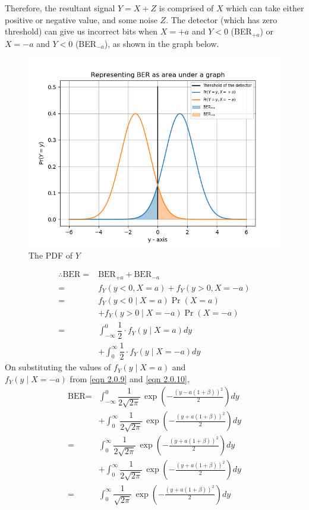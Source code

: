 \documentclass[journal,10pt,twocolumn]{IEEEtran}
\begin{document}
Therefore, the resultant signal $Y = X+Z$ is comprised of $X$ which can take either positive or negative value, and some noise $Z$. The detector (which has zero threshold) can give us incorrect bits when $X = +a$ and $Y<0$ (BER$_{+a}$) or $X=-a$ and $Y<0$ (BER$_{-a}$), as shown in the graph below.
~\\[-2em]
\begin{figure}[!htb]
    \centering    
	\includegraphics[width=\columnwidth]{./Figures/Figure_1.png}
    \caption{The PDF of $Y$}
\end{figure}
\begin{align}
\therefore \text{BER} = {}& \text{BER}_{+a} + \text{BER}_{-a}\\
= {}& f_Y(y < 0, X = a) + f_Y(y>0, X = -a)\\
 = {}& f_Y(y<0\;|\;X = a) \Pr(X=a) \nonumber \\ &+ f_Y(y>0\;|\;X = -a) \Pr(X=-a)\\
 = {}& \int_{- \infty} ^ 0 \dfrac{1}{2} \cdot f_Y(y\;|\;X = a) dy \nonumber \\
 &+ \int_{0} ^{ \infty} \dfrac{1}{2} \cdot f_Y(y\;|\;X = -a) dy
\end{align}
On substituting the values of $f_Y(y\;|\;X=a)$ and\\
$f_Y(y\;|\;X=-a)$ from \ref{eqn 2.0.9} and \ref{eqn 2.0.10}, 
\begin{align}
\text{BER} = {}& \int_{- \infty } ^ 0 \dfrac{1}{2\sqrt{2\pi}}\,\exp \left(-\frac{(y - a(1 + \beta))^2}{2} \right) dy \nonumber \\
&+ \int_{0} ^ {\infty } \dfrac{1}{2\sqrt{2\pi}}\,\exp \left(-\frac{(y + a(1 + \beta))^2}{2} \right) dy\\
 = {}& \int_{0} ^ {\infty } \dfrac{1}{2\sqrt{2\pi}}\,\exp \left(-\frac{(y + a(1 + \beta))^2}{2} \right) dy \nonumber \\
 &+ \int_{0} ^ {\infty } \dfrac{1}{2\sqrt{2\pi}}\,\exp \left(-\frac{(y + a(1 + \beta))^2}{2} \right) dy\\
 = {}& \int_{0} ^ {\infty } \dfrac{1}{\sqrt{2\pi}}\,\exp \left(-\frac{(y + a(1 + \beta))^2}{2} \right) dy \label{eqn 2.0.19}
\end{align} 
\end{document}
